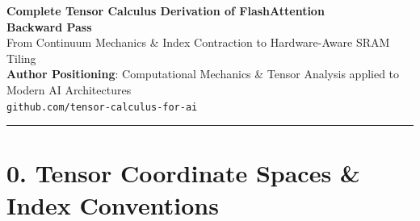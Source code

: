 \documentclass[11pt,a4paper]{article}
\begin{document}
{\LARGE\bfseries Complete Tensor Calculus Derivation of FlashAttention\\[2pt] Backward Pass}\\[6pt]
{\large\color{brandblue}\textsf{From Continuum Mechanics \& Index Contraction to Hardware-Aware SRAM Tiling}}\\[6pt]
{\small\color{darkslate}\textbf{Author Positioning}: Computational Mechanics \& Tensor Analysis applied to Modern AI Architectures}\\
{\small\color{gray}\texttt{github.com/tensor-calculus-for-ai}}
\vspace{0.08in}
\hrule
\vspace{0.08in}

\section*{0. Tensor Coordinate Spaces \& Index Conventions}
\end{document}
